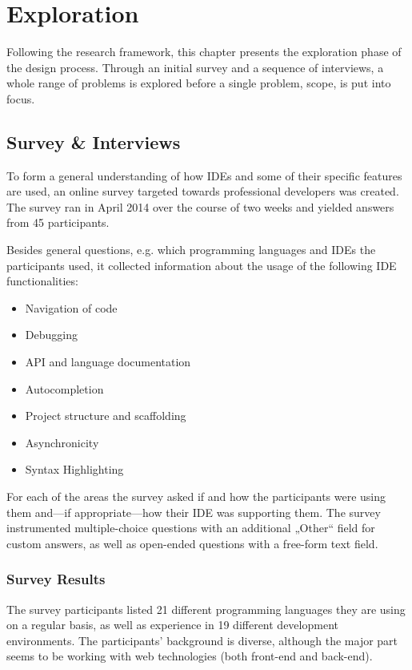\chapter{Exploration}\label{exploration}

Following the research framework, this chapter presents the exploration
phase of the design process. Through an initial survey and a sequence of
interviews, a whole range of problems is explored before a single
problem, scope, is put into focus.

\section{Survey \& Interviews}\label{survey-interviews}

To form a general understanding of how IDEs and some of their specific
features are used, an online survey targeted towards professional
developers was created. The survey ran in April 2014 over the course of
two weeks and yielded answers from 45 participants.

Besides general questions, e.g. which programming languages and IDEs the
participants used, it collected information about the usage of the
following IDE functionalities:

\begin{itemize}
\itemsep1pt\parskip0pt
\item
  Navigation of code
\item
  Debugging
\item
  API and language documentation
\item
  Autocompletion
\item
  Project structure and scaffolding
\item
  Asynchronicity
\item
  Syntax Highlighting
\end{itemize}

For each of the areas the survey asked if and how the participants were
using them and—if appropriate—how their IDE was supporting them. The
survey instrumented multiple-choice questions with an additional „Other“
field for custom answers, as well as open-ended questions with a
free-form text field.

\subsection{Survey Results}\label{survey-results}

The survey participants listed 21 different programming languages they
are using on a regular basis, as well as experience in 19 different
development environments. The participants’ background is diverse,
although the major part seems to be working with web technologies (both
front-end and back-end).

